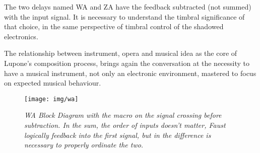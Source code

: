 \documentclass[twoside,a4paper]{article}
\begin{document}
The two delays named WA and ZA have the feedback subtracted (not summed) with the
input signal. It is necessary to understand the timbral significance of that
choice, in the same perspective of timbral control of the shadowed electronics.

The relationship between instrument, opera and musical idea as the core of Lupone's
composition process, brings again the conversation at the necessity to have a
musical instrument, not only an electronic environment, mastered to focus on
expected musical behaviour.



\begin{figure}[ht]
\centerline{\texttt{[image: img/wa]}}
\caption{\label{wa-block}{\it WA Block Diagram with the macro on the signal
crossing before subtraction. In the sum, the order of inputs doesn't matter,
\emph{Faust} logically feedback into the first signal, but in the difference is
necessary to properly ordinate the two.}}
\end{figure}

\end{document}
